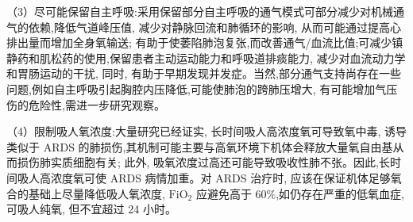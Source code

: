 \documentclass[10pt]{article}
\begin{document}
（3）尽可能保留自主呼吸:采用保留部分自主呼吸的通气模式可部分减少对机械通气的依赖,降低气道峰压值, 减少对静脉回流和肺循环的影响, 从而可能通过提高心排出量而增加全身氧输送; 有助于使萎陷肺泡复张,而改善通气/血流比值;可减少镇静药和肌松药的使用,保留患者主动运动能力和呼吸道排痰能力, 减少对血流动力学和胃肠运动的干扰, 同时, 有助于早期发现并发症。当然,部分通气支持尚存在一些问题,例如自主呼吸引起胸腔内压降低,可能使肺泡的跨肺压增大, 有可能增加气压伤的危险性,需进一步研究观察。

（4）限制吸人氧浓度:大量研究已经证实, 长时间吸人高浓度氧可导致氧中毒, 诱导类似于 ARDS 的肺损伤,其机制可能主要与高氧环境下机体会释放大量氧自由基从而损伤肺实质细胞有关; 此外, 吸氧浓度过高还可能导致吸收性肺不张。因此,长时间吸人高浓度氧可使 ARDS 病情加重。对 ARDS 治疗时, 应该在保证机体足够氧合的基础上尽量降低吸人氧浓度, $\mathrm{FiO}_{2}$ 应避免高于 $60 \%$,如仍存在严重的低氧血症, 可吸人纯氧, 但不宜超过 24 小时。
\end{document}
